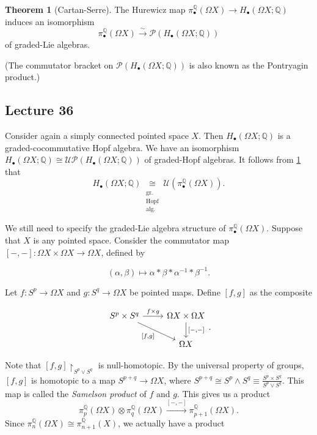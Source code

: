 \documentclass[10pt,letterpaper,cm]{nupset}
\theoremstyle{definition}
\theoremstyle{theorem}
\newtheorem{theorem}[defn]{Theorem}
\theoremstyle{remark}
\renewcommand{\P}{\mathcal P}
\newcommand{\Q}{\mathbb Q}
\newcommand{\U}{\mathcal U}
\newcommand{\1}{\mathbb{1}}
\newcommand{\0}{\vec 0}
\begin{document}
\begin{theorem}[Cartan-Serre]\label{C-S}
The Hurewicz map $\pi_{\bullet}^{\Q}(\Omega{X}) \to H_{\bullet}(\Omega{X}; \Q)$ induces an isomorphism
\[
\pi_{\bullet}^{\Q}(\Omega{X}) \xrightarrow{\sim} \P(H_{\bullet}(\Omega{X}; \Q))
\] of graded-Lie algebras.
\end{theorem}

(The commutator bracket on $\P(H_{\bullet}(\Omega{X}; \Q))$ is also known as the Pontryagin product.)

\subsection{Lecture 36}
 
 Consider again a simply connected pointed space $X$. Then $H_{\bullet}(\Omega{X}; \Q)$ is a graded-cocommutative Hopf algebra. We have an isomorphism   $H_{\bullet}(\Omega{X}; \Q)  \cong \U{\P(H_{\bullet}(\Omega{X}; \Q))}$ of graded-Hopf algebras. It follows from \cref{C-S} that 
 \[ \label{Hiso}
 H_{\bullet}(\Omega{X}; \Q) \underset{\substack{ \\ \text{gr.} \\ \text{Hopf} \\ \text{alg.}}}{\cong} \U(\pi_{\bullet}^{\Q}(\Omega{X}))
 \tag{$\dagger$}.\]

We still need to specify the graded-Lie algebra structure of $\pi_{\bullet}^{\Q}(\Omega{X})$. Suppose that $X$ is any pointed space. Consider the commutator map $\left[{-}, {-}\right] : \Omega{X} \times \Omega{X} \to \Omega{X}$, defined by

\[
\left(\alpha, \beta\right) \mapsto \alpha \ast \beta \ast \alpha^{-1}\ast \beta^{-1}
.\] 

Let $f : S^p \to \Omega{X}$ and $g : S^q \to \Omega{X}$ be pointed maps. Define $\left[f,g\right]$ as the composite

\[
\begin{tikzcd}
	{S^p \times S^q} & {\Omega{X} \times \Omega{X}} \\
	& {\Omega{X}}
	\arrow["{f\times g}", from=1-1, to=1-2]
	\arrow["{\left[{-}, {-}\right]}", from=1-2, to=2-2]
	\arrow["{\left[f,g\right]}"', from=1-1, to=2-2]
\end{tikzcd}.
\]

Note that $\left[f,g\right]\restriction_{S^p \vee S^q}$ is null-homotopic. By the universal property of groups,  $\left[f,g\right]$ is homotopic to a map $S^{p+q} \to \Omega{X}$, where $S^{p+q} \cong S^p \land S^q  \equiv \frac{S^p \times S^q}{S^p \vee S^q}$.  This map is called the \textit{Samelson product} of $f$ and $g$. This gives us a product
\[
\pi_p^{\Q}(\Omega{X}) \otimes \pi_q^{\Q}(\Omega{X}) \xrightarrow{\left[{-}, {-}\right]} \pi_{p+1}^{\Q}(\Omega{X}).
\]
Since $\pi_n^{\Q}(\Omega{X}) \cong \pi_{n+1}^{\Q}(X)$, we actually have a product
\end{document}

